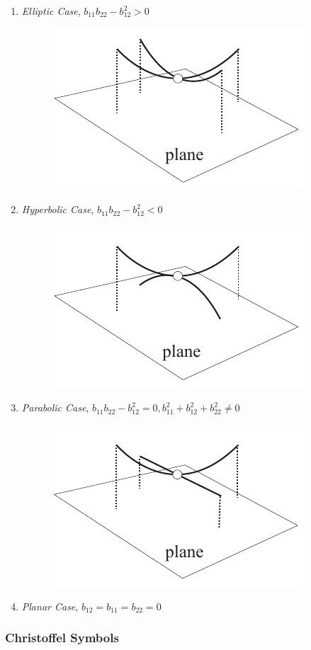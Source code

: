 \begin{enumerate}
\item \textit{Elliptic Case}, $ b_{11}b_{22}-b_{12}^2  > 0$ \\

\begin{figure}[H]
\centering
\includegraphics[height = 0.2\linewidth ]{figure/Theory/ellipticCase.pdf}
\end{figure}

\item \textit{Hyperbolic Case}, $b_{11}b_{22}-b_{12}^2 < 0$ \\
\begin{figure}[H]
\centering
\includegraphics[height = 0.2\linewidth ]{figure/Theory/hyperbolicCase.pdf}
\end{figure}


\item \textit{Parabolic Case}, $b_{11}b_{22}-b_{12}^2 = 0, b_{11}^2 + b_{12}^2 + b_{22}^2 \neq 0 $ \\
\begin{figure}[H]
\centering
\includegraphics[height = 0.2\linewidth ]{figure/Theory/parabolicCase.pdf}
\end{figure}

\item \textit{Planar Case}, $b_{12} = b_{11} = b_{22} = 0$ \\
\end{enumerate}


\subsubsection{Christoffel Symbols}

